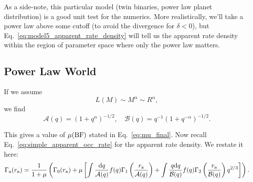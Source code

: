 \documentclass[12pt,modern]{aastex61}
\begin{document}
As a side-note, this particular model (twin binaries, power law planet 
distribution) is a good unit test for the numerics.
More realistically, we'll take a power law above some cutoff (to avoid the 
divergence for $\delta<0$), but Eq.~\ref{eq:model5_apparent_rate_density} will 
tell us the apparent rate density within the region of parameter space where 
only the power law matters.

\subsection{Power Law World}

If we assume 
\begin{equation}
	L(M) \sim M^\alpha \sim R^\alpha,
\end{equation}
we find 
\begin{equation}
\mathcal{A}(q)
=(1+q^\alpha)^{-1/2},
\quad
\mathcal{B}(q)
=q^{-1}(1+q^{-\alpha})^{-1/2}.
\end{equation}

This gives a value of $\mu({\rm BF})$ stated in Eq.~\ref{eq:mu_final}.
Now recall Eq.~\ref{eq:simple_apparent_occ_rate} for the apparent rate 
density. We restate it here:
\begin{equation}
\Gamma\a(r\a) = \frac{1}{1+\mu}
\left(
\Gamma_0(r\a) +
\mu \left[
\int \frac{{\rm d}q}{\mathcal{A}(q)} f(q) 
\Gamma_1\left( \frac{r\a}{\mathcal{A}(q)} \right)
+
\int \frac{q {\rm d}q}{\mathcal{B}(q)} f(q)
\Gamma_2\left(\frac{r\a}{\mathcal{B}(q)}\right) q^{2/3}
\right]
\right).
\end{equation}
\end{document}
